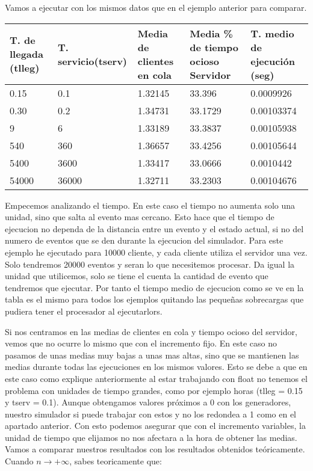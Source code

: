 \documentclass[]{article}
\begin{document}
Vamos a ejecutar con los mismos datos que en el ejemplo anterior para comparar.
	\begin{table}[H]
		\begin{center}
			\begin{tabularx}{0.9\textwidth}{|X|X|X|X|X|}
				\hline
				\textbf{T. de llegada (tlleg)} & \textbf{T. servicio(tserv)}&\textbf{Media de clientes en cola} & \textbf{Media \% de tiempo ocioso Servidor} & \textbf{T. medio de ejecución (seg)} \\
				\hline \hline
				0.15 & 0.1 & 1.32145 & 33.396 &0.0009926\\ \hline
				0.30 & 0.2 & 1.34731 & 33.1729 &0.00103374 \\ \hline
				9 & 6& 1.33189 & 33.3837  &0.00105938\\ \hline
				540 & 360 & 1.36657 &33.4256 & 0.00105644 \\ \hline
				5400 & 3600 & 1.33417 & 33.0666 &0.0010442\\ \hline
				54000 & 36000 & 1.32711  & 33.2303 & 0.00104676 \\ \hline
				
			\end{tabularx}
			
		\end{center}
	\end{table}
Empecemos analizando el tiempo. En este caso el tiempo no aumenta solo una unidad, sino que salta al evento mas cercano. Esto hace que el tiempo de ejecucion no dependa de la distancia entre un evento y el estado actual, si no del numero de eventos que se den durante la ejecucion del simulador. Para este ejemplo he ejecutado para 10000 cliente, y cada cliente utiliza el servidor una vez. Solo tendremos 20000 eventos y seran lo que necesitemos procesar. Da igual la unidad que utilicemos, solo se tiene el cuenta la cantidad de evento que tendremos que ejecutar. Por tanto el tiempo medio de ejecucion como se ve en la tabla es el mismo para todos los ejemplos quitando las pequeñas sobrecargas que pudiera tener el procesador al ejecutarlors.
\newline

Si nos centramos en las medias de clientes en cola y tiempo ocioso del servidor, vemos que no ocurre lo mismo que con el incremento fijo. En este caso no pasamos de unas medias muy bajas a unas mas altas, sino que se mantienen las medias durante todas las ejecuciones en los mismos valores. Esto se debe a que en este caso como explique anteriormente al estar trabajando con float no tenemos el problema con unidades de tiempo grandes, como por ejemplo horas (tlleg = 0.15 y tserv = 0.1). Aunque obtengamos valores próximos a 0 con los generadores, nuestro simulador si puede trabajar con estos y no los redondea a 1 como en el apartado anterior. Con esto podemos asegurar que con el incremento variables, la unidad de tiempo que elijamos no nos afectara a la hora de obtener las medias.
\newline
\newpage
Vamos a comparar nuestros resultados con los resultados obtenidos teóricamente. Cuando $n \rightarrow+\infty$, sabes teoricamente que:
 
\end{document}
